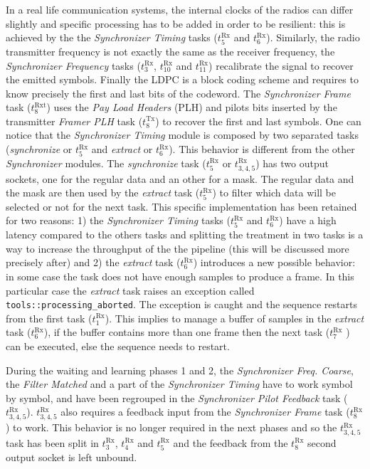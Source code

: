 In a real life communication systems, the internal clocks of the radios can
differ slightly and specific processing has to be added in order to be
resilient: this is achieved by the the \emph{Synchronizer Timing} tasks
($t^\text{Rx}_5$ and $t^\text{Rx}_6$). Similarly, the radio transmitter
frequency is not exactly the same as the receiver frequency, the
\emph{Synchronizer Frequency} tasks ($t^\text{Rx}_3$, $t^\text{Rx}_{10}$ and
$t^\text{Rx}_{11}$) recalibrate the signal to recover the emitted symbols.
Finally the LDPC is a block coding scheme and requires to know precisely the
first and last bits of the codeword. The \emph{Synchronizer Frame} task
($t^\text{Rxt}_8$) uses the \emph{Pay Load Headers} (PLH) and pilots bits
inserted by the transmitter \emph{Framer PLH} task ($t^\text{Tx}_8$) to recover
the first and last symbols. One can notice that the \emph{Synchronizer Timing}
module is composed by two separated tasks (\emph{synchronize} or $t^\text{Rx}_5$
and \emph{extract} or $t^\text{Rx}_6$). This behavior is different from the
other \emph{Synchronizer} modules. The \emph{synchronize} task ($t^\text{Rx}_5$
or $t^\text{Rx}_{3,4,5}$) has two output sockets, one for the regular data and
an other for a mask. The regular data and the mask are then used by the
\emph{extract} task ($t^\text{Rx}_5$) to filter which data will be selected or
not for the next task. This specific implementation has been retained for two
reasons: 1) the \emph{Synchronizer Timing} tasks ($t^\text{Rx}_5$ and
$t^\text{Rx}_6$) have a high latency compared to the others tasks and splitting
the treatment in two tasks is a way to increase the throughput of the the
pipeline (this will be discussed more precisely after) and 2) the \emph{extract}
task ($t^\text{Rx}_6$) introduces a new possible behavior: in some case the task
does not have enough samples to produce a frame. In this particular case the
\emph{extract} task raises an exception called \verb|tools::processing_aborted|.
The exception is caught and the sequence restarts from the first task
($t^\text{Rx}_1$). This implies to manage a buffer of samples in the
\emph{extract} task ($t^\text{Rx}_6$), if the buffer contains more than one
frame then the next task ($t^\text{Rx}_7$ ) can be executed, else the sequence
needs to restart.

During the waiting and learning phases 1 and 2, the \emph{Synchronizer Freq.
Coarse}, the \emph{Filter Matched} and a part of the \emph{Synchronizer Timing}
have to work symbol by symbol, and have been regrouped in the \emph{Synchronizer
Pilot Feedback} task ($t^\text{Rx}_{3,4,5}$). $t^\text{Rx}_{3,4,5}$ also
requires a feedback input from the \emph{Synchronizer Frame} task
($t^\text{Rx}_8$) to work. This behavior is no longer required in the next
phases and so the $t^\text{Rx}_{3,4,5}$ task has been split in $t^\text{Rx}_3$,
$t^\text{Rx}_4$ and $t^\text{Rx}_5$ and the feedback from the $t^\text{Rx}_8$
second output socket is left unbound.

